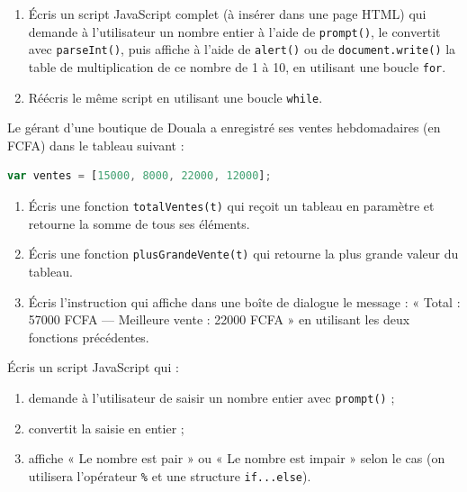 \documentclass[11pt]{article}
\newcounter{popsec}
\newcounter{popsub}
\newcommand{\courssub}[1]{%
  \stepcounter{popsub}%
  \par\vspace{9pt}\noindent{\popxbold\fontsize{11.5}{13}\selectfont\color{popink}{\color{poporange}\thepopsec.\thepopsub}\hspace{6pt}#1}\par\nopagebreak\vspace{4pt}
}
\begin{document}
\courssub{Je m'entraîne}

\begin{exercice}
\begin{enumerate}
\item Écris un script JavaScript complet (à insérer dans une page HTML) qui demande à l'utilisateur un nombre entier à l'aide de \texttt{prompt()}, le convertit avec \texttt{parseInt()}, puis affiche à l'aide de \texttt{alert()} ou de \texttt{document.write()} la table de multiplication de ce nombre de 1 à 10, en utilisant une boucle \texttt{for}.
\item Réécris le même script en utilisant une boucle \texttt{while}.
\end{enumerate}
\end{exercice}

\begin{exercice}
Le gérant d'une boutique de Douala a enregistré ses ventes hebdomadaires (en FCFA) dans le tableau suivant :
\begin{lstlisting}[language=JavaScript]
var ventes = [15000, 8000, 22000, 12000];
\end{lstlisting}
\begin{enumerate}
\item Écris une fonction \texttt{totalVentes(t)} qui reçoit un tableau en paramètre et retourne la somme de tous ses éléments.
\item Écris une fonction \texttt{plusGrandeVente(t)} qui retourne la plus grande valeur du tableau.
\item Écris l'instruction qui affiche dans une boîte de dialogue le message : « Total : 57000 FCFA — Meilleure vente : 22000 FCFA » en utilisant les deux fonctions précédentes.
\end{enumerate}
\end{exercice}

\begin{exercice}
Écris un script JavaScript qui :
\begin{enumerate}
\item demande à l'utilisateur de saisir un nombre entier avec \texttt{prompt()} ;
\item convertit la saisie en entier ;
\item affiche « Le nombre est pair » ou « Le nombre est impair » selon le cas (on utilisera l'opérateur \texttt{\%} et une structure \texttt{if...else}).
\end{enumerate}
\end{exercice}
\end{document}
